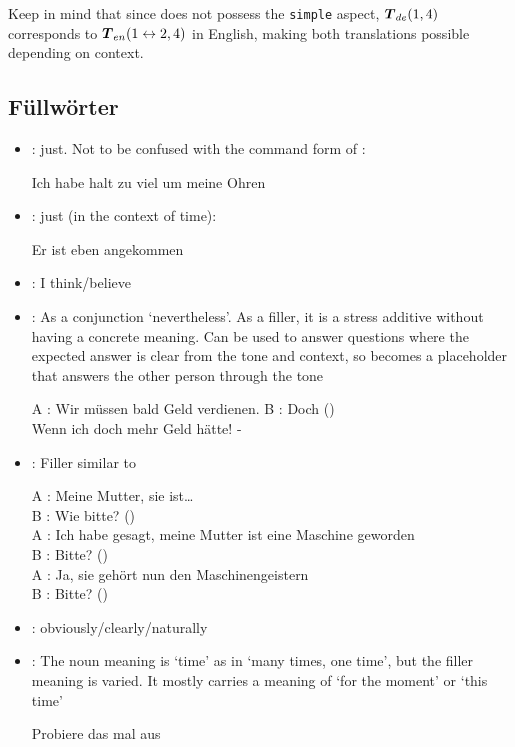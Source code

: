 \bt{*}Keep in mind that since  does not possess the \texttt{simple} aspect, $\boldsymbol{T}_{de}(1,4)$ corresponds to  $\boldsymbol{T}_{en}(1\leftrightarrow2,4)$ in English, making both translations possible depending on context.
\subsection[Fillers]{Füllwörter}
\begin{itemize}
    \item {}: just. Not to be confused with the command form of :\begin{example}
        Ich habe halt zu viel um meine Ohren \end{example}
    \item {}: just (in the context of time):\begin{example}
        Er ist eben angekommen \end{example}
    \item {}: I think/believe
    \item {}:  As a conjunction `nevertheless'. As a filler, it is a stress additive without having a concrete meaning. Can be used to answer questions where the expected answer is clear from the tone and context, so  becomes a placeholder that answers the other person through the tone\begin{example}
        A : Wir müssen bald Geld verdienen. B : Doch ()\\ Wenn ich doch mehr Geld hätte! - \end{example}
    \item {}: Filler similar to \begin{example}
        A : Meine Mutter, sie ist\ldots \\ B : Wie bitte? ()\\ A : Ich habe gesagt, meine Mutter ist eine Maschine geworden \\ B : Bitte? ()\\ A : Ja, sie gehört nun den Maschinengeistern\\ B : Bitte? () \end{example}
    \item {}: obviously/clearly/naturally
    \item {}: The noun meaning is `time' as in `many times, one time', but the filler meaning is varied. It mostly carries a meaning of `for the moment' or `this time' \begin{example} Probiere das mal aus \end{example}

\end{itemize}
